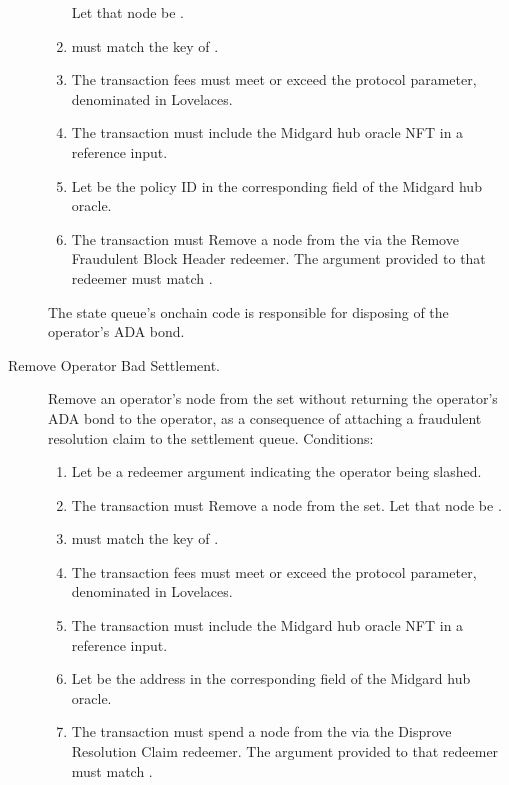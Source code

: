 \documentclass[../midgard.tex]{subfiles}
\begin{document}
\begin{description}
\begin{enumerate}
              Let that node be .
            \item {} must match the key of .
            \item The transaction fees must meet or exceed the  protocol parameter, denominated in Lovelaces.
            \item The transaction must include the Midgard hub oracle NFT in a reference input.
            \item Let  be the policy ID in the corresponding field of the Midgard hub oracle.
            \item The transaction must Remove a node from the  via the Remove Fraudulent Block Header redeemer.
              The  argument provided to that redeemer must match .
        \end{enumerate}

        The state queue's onchain code is responsible for disposing of the operator's ADA bond.
    \item[Remove Operator Bad Settlement.] Remove an operator's node from the  set without returning the operator's ADA bond to the operator, as a consequence of attaching a fraudulent resolution claim to the settlement queue.
      Conditions:
        \begin{enumerate}
            \item Let  be a redeemer argument indicating the operator being slashed.
            \item The transaction must Remove a node from the  set.
              Let that node be .
            \item {} must match the key of .
            \item The transaction fees must meet or exceed the  protocol parameter, denominated in Lovelaces.
            \item The transaction must include the Midgard hub oracle NFT in a reference input.
            \item Let  be the address in the corresponding field of the Midgard hub oracle.
            \item The transaction must spend a node from the  via the Disprove Resolution Claim redeemer.
              The  argument provided to that redeemer must match .
        \end{enumerate}


\end{description}
\end{document}
